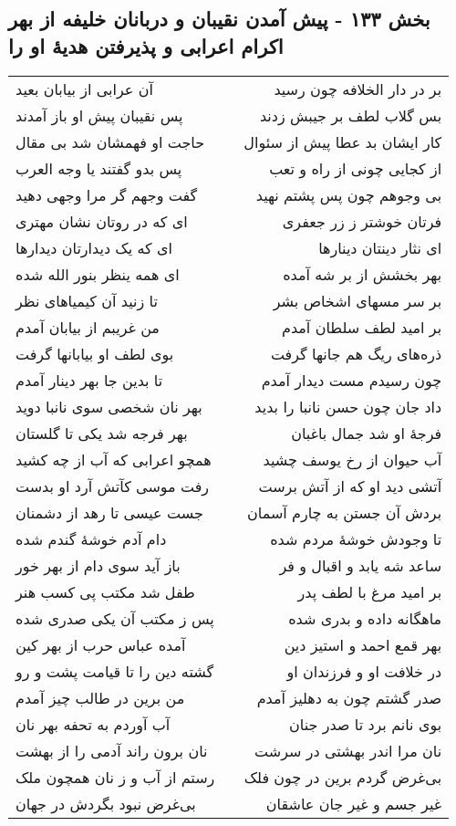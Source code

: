 \begin{center}
\section*{بخش ۱۳۳ - پیش آمدن نقیبان و دربانان خلیفه از بهر اکرام اعرابی و پذیرفتن هدیهٔ او را}
\label{sec:sh133}
\begin{longtable}{l p{0.5cm} r}
آن عرابی از بیابان بعید
&&
بر در دار الخلافه چون رسید
\\
پس نقیبان پیش او باز آمدند
&&
بس گلاب لطف بر جیبش زدند
\\
حاجت او فهمشان شد بی مقال
&&
کار ایشان بد عطا پیش از سئوال
\\
پس بدو گفتند یا وجه العرب
&&
از کجایی چونی از راه و تعب
\\
گفت وجهم گر مرا وجهی دهید
&&
بی وجوهم چون پس پشتم نهید
\\
ای که در روتان نشان مهتری
&&
فرتان خوشتر ز زر جعفری
\\
ای که یک دیدارتان دیدارها
&&
ای نثار دینتان دینارها
\\
ای همه ینظر بنور الله شده
&&
بهر بخشش از بر شه آمده
\\
تا زنید آن کیمیاهای نظر
&&
بر سر مسهای اشخاص بشر
\\
من غریبم از بیابان آمدم
&&
بر امید لطف سلطان آمدم
\\
بوی لطف او بیابانها گرفت
&&
ذره‌های ریگ هم جانها گرفت
\\
تا بدین جا بهر دینار آمدم
&&
چون رسیدم مست دیدار آمدم
\\
بهر نان شخصی سوی نانبا دوید
&&
داد جان چون حسن نانبا را بدید
\\
بهر فرجه شد یکی تا گلستان
&&
فرجهٔ او شد جمال باغبان
\\
همچو اعرابی که آب از چه کشید
&&
آب حیوان از رخ یوسف چشید
\\
رفت موسی کآتش آرد او بدست
&&
آتشی دید او که از آتش برست
\\
جست عیسی تا رهد از دشمنان
&&
بردش آن جستن به چارم آسمان
\\
دام آدم خوشهٔ گندم شده
&&
تا وجودش خوشهٔ مردم شده
\\
باز آید سوی دام از بهر خور
&&
ساعد شه یابد و اقبال و فر
\\
طفل شد مکتب پی کسب هنر
&&
بر امید مرغ با لطف پدر
\\
پس ز مکتب آن یکی صدری شده
&&
ماهگانه داده و بدری شده
\\
آمده عباس حرب از بهر کین
&&
بهر قمع احمد و استیز دین
\\
گشته دین را تا قیامت پشت و رو
&&
در خلافت او و فرزندان او
\\
من برین در طالب چیز آمدم
&&
صدر گشتم چون به دهلیز آمدم
\\
آب آوردم به تحفه بهر نان
&&
بوی نانم برد تا صدر جنان
\\
نان برون راند آدمی را از بهشت
&&
نان مرا اندر بهشتی در سرشت
\\
رستم از آب و ز نان همچون ملک
&&
بی‌غرض گردم برین در چون فلک
\\
بی‌غرض نبود بگردش در جهان
&&
غیر جسم و غیر جان عاشقان
\\
\end{longtable}
\end{center}
